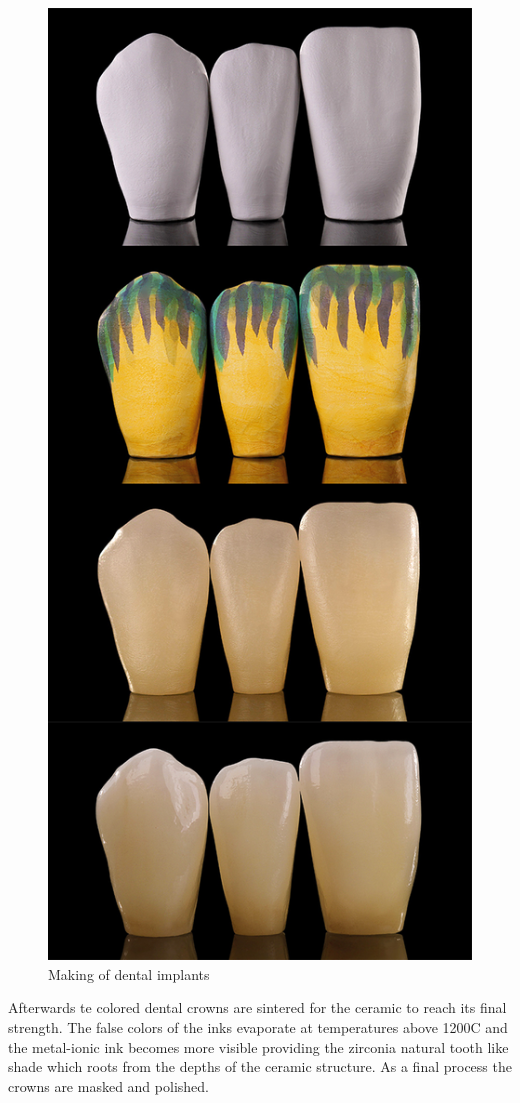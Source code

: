 \begin{figure}[h]
	\centering
	\includegraphics[height=0.6\textwidth]{grafiken/CrownProcesses.jpg}
	\caption{Making of dental implants \citep{zirkonzahn2018} }
	\label{fig:CrownProcesses}
\end{figure} 
 

Afterwards te colored dental crowns are sintered for the ceramic to reach its final strength. The false colors of the inks evaporate at temperatures above 1200\textdegree C and the metal-ionic ink becomes more visible providing the zirconia natural tooth like shade which roots from the depths of the ceramic structure. As a final process the crowns are masked and polished.



